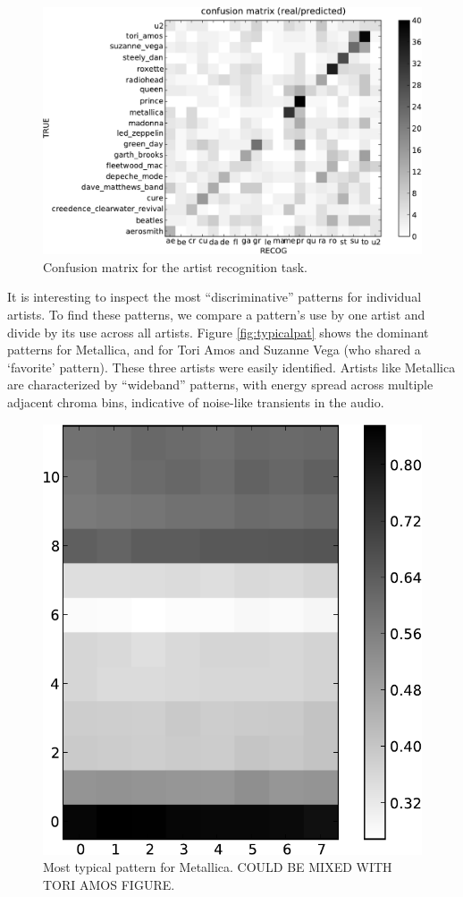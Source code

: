 \documentclass{article}
\begin{document}
\begin{figure}[t]
\includegraphics[width=.9\columnwidth]{conf_mat_per_artist}
\caption{\small{Confusion matrix for the artist recognition task.}}
\label{fig:conf_mat}
\end{figure}

It is interesting to inspect the most ``discriminative'' patterns for 
individual artists.  
To find these patterns, we compare a pattern's use by one artist and divide
by its use across all artists. Figure \ref{fig:typicalpat} 
shows the dominant patterns for Metallica, and for Tori Amos and
Suzanne Vega (who shared a `favorite' pattern). 
These three artists were easily identified.
Artists like Metallica are characterized by ``wideband'' patterns, 
with energy spread across multiple adjacent chroma bins, 
indicative of noise-like transients in the audio.

\iffalse
\begin{figure}[htb]
\begin{center}
\includegraphics[width=.4\columnwidth]{metallica_pattern}
\end{center}
\caption{\small{Most typical pattern for Metallica.
COULD BE MIXED WITH TORI AMOS FIGURE.
}}
\label{fig:metallica}
\end{figure}
\end{document}
